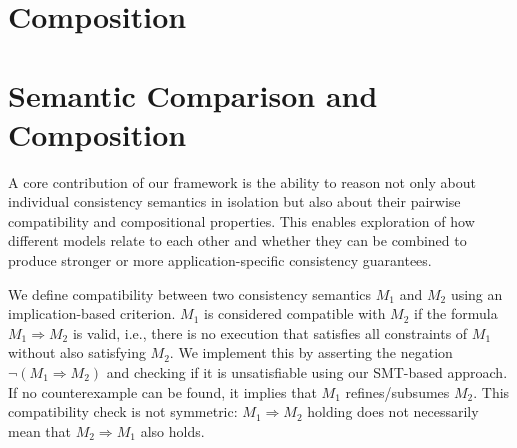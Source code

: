 \section{Composition}

{
  \color{blue}
  \section{Semantic Comparison and Composition}

  A core contribution of our framework is the ability to reason not only about
  individual consistency semantics in isolation but also about their pairwise
  compatibility and compositional properties. This enables exploration of how
  different models relate to each other and whether they can be combined to
  produce stronger or more application-specific consistency guarantees.

  We define compatibility between two consistency semantics $M_1$ and
  $M_2$ using
  an implication-based criterion. $M_1$ is considered compatible with
  $M_2$ if the formula $M_1 \Rightarrow M_2$ is valid, i.e., there is no
  execution that satisfies all constraints of $M_1$ without also
  satisfying $M_2$.
  We implement this by asserting the negation $\neg (M_1 \Rightarrow M_2)$ and
  checking if it is unsatisfiable using our SMT-based approach. If no
  counterexample can be found, it implies that $M_1$
  refines/subsumes $M_2$. This compatibility check is not symmetric:
  $M_1 \Rightarrow M_2$
  holding does not necessarily mean that $M_2 \Rightarrow M_1$ also holds.

}
